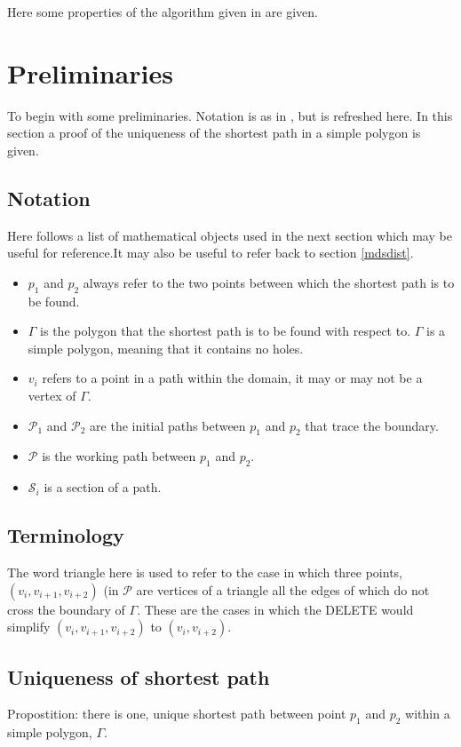 \label{chap-WAD}


Here some properties of the algorithm given in  are given.

\section{Preliminaries}

To begin with some preliminaries. Notation is as in , but is refreshed here. In this section a proof of the uniqueness of the shortest path in a simple polygon is given.

\subsection{Notation}

Here follows a list of mathematical objects used in the next section which may be useful for reference.It may also be useful to refer back to section \ref{mdsdist}.
\begin{itemize}
   \item $p_1$ and $p_2$ always refer to the two points between which the shortest path is to be found.
   \item $\Gamma$ is the polygon that the shortest path is to be found with respect to. $\Gamma$ is a simple polygon, meaning that it contains no holes.
   \item $v_i$ refers to a point in a path within the domain, it may or may not be a vertex of $\Gamma$.
   \item $\mathcal{P}_1$ and $\mathcal{P}_2$ are the initial paths between $p_1$ and $p_2$ that trace the boundary.
   \item $\mathcal{P}$ is the working path between $p_1$ and $p_2$.
   \item$\mathcal{S}_{i}$ is a section of a path.
\end{itemize}

\subsection{Terminology}

The word triangle here is used to refer to the case in which three points, $(v_i,v_{i+1},v_{i+2})$ (in $\mathcal{P}$ are vertices of a triangle all the edges of which do not cross the boundary of $\Gamma$. These are the cases in which the DELETE would simplify $(v_i,v_{i+1},v_{i+2})$ to $(v_i,v_{i+2})$.


\subsection{Uniqueness of shortest path}
\label{app-unique-sp}
Propostition: there is one, unique shortest path between point $p_1$ and $p_2$ within a simple polygon, $\Gamma$.

